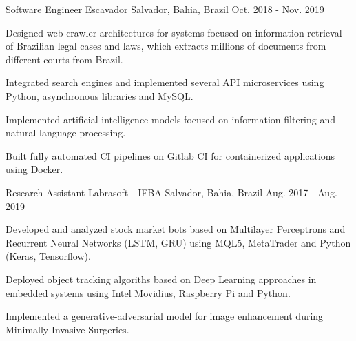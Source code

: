 \begin{cventries}
  \cventry
    {Software Engineer} %
    {Escavador} %
    {Salvador, Bahia, Brazil} %
    {Oct. 2018 - Nov. 2019} %
    {
      \begin{cvitems} %
      \item {Designed web crawler architectures for systems focused on information retrieval of Brazilian legal cases and laws, which extracts millions of documents from different courts from Brazil.}
        \item {Integrated search engines and implemented several API microservices using Python, asynchronous libraries and MySQL.}
        \item {Implemented artificial intelligence models focused on information filtering and natural language processing.}
        \item {Built fully automated CI pipelines on Gitlab CI for containerized applications using Docker.}
      \end{cvitems}
    }

  \cventry
    {Research Assistant} %
    {Labrasoft - IFBA} %
    {Salvador, Bahia, Brazil} %
    {Aug. 2017 - Aug. 2019} %
    {
      \begin{cvitems} %
      \item {Developed and analyzed stock market bots based on Multilayer Perceptrons and Recurrent Neural Networks (LSTM, GRU) using MQL5, MetaTrader and Python (Keras, Tensorflow).}
        \item {Deployed object tracking algoriths based on Deep Learning approaches in embedded systems using Intel Movidius, Raspberry Pi and Python.}
        \item {Implemented a generative-adversarial model for image enhancement during Minimally Invasive Surgeries.}
      \end{cvitems}
    }


\end{cventries}
